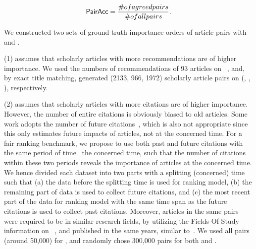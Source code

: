 \vspace{-1ex}
\begin{small}
\begin{equation}
\label{eq-metric}
\PairAcc=\frac{\#\mbox{ of agreed pairs}}{\# \mbox{ of all pairs}}.
\end{equation}
\end{small}
\vspace{-2ex}

We constructed two sets of ground-truth importance orders of article pairs with \recom and \fcita.


\noindent
(1) \recom assumes that scholarly articles with more recommendations are of higher importance.
%
We used the numbers of recommendations of 93 articles on \aan~\cite{Liang16AAAI}, %
and, by exact title matching, %
generated (2133, 966, 1972) scholarly article pairs on (\aan, \aminer, \magdata), respectively.


\noindent
(2) \fcita assumes that scholarly articles with more citations are of higher importance.
%
However, the number of entire citations is obviously biased to old articles. Some work adopts the number of future citations~\cite{Wang13AAAI,Wang16TIST,Li08TSRanking}, which is also not appropriate since this only estimates future impacts of articles, not at the concerned time. For a fair ranking benchmark, we propose to use both past and future citations with the same period of time \wrt\ the concerned time, such that the number of citations within these two periods reveals the importance of articles at the concerned time.
%
We hence divided each dataset into two parts with a splitting (concerned) time such that (a) the data before the splitting time is used for ranking model, (b) the remaining part of data is used to collect future citations, and (c) the most recent part of the data for ranking model with the same time span as the future citations is used to collect past citations.
%
%
Moreover, articles in the same pairs were required to be in similar research fields, by utilizing the Fields-Of-Study information on \magdata~\cite{Sinha15:MAG}, and published in the same years, similar to~\cite{Wang16TIST}.
We used all pairs (around 50,000) for \aan, and randomly chose 300,000 pairs for both \aminer and \magdata.

